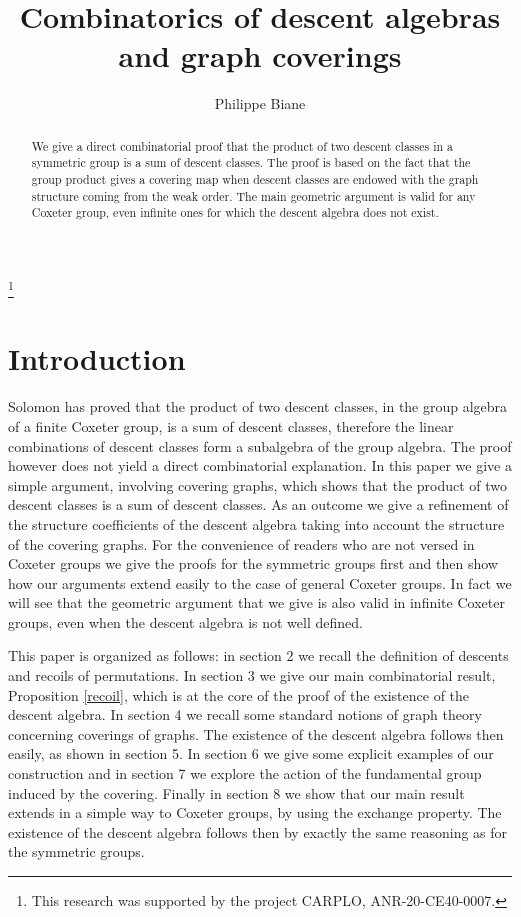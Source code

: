 \documentclass[11pt,a4paper]{amsart}
\theoremstyle{contraction}
\begin{document}
\author{Philippe  Biane}
\thanks{This research was supported by the project CARPLO, ANR-20-CE40-0007.}
\address{Institut Gaspard Monge
UMR CNRS - 8049
Universit\'e Gustave Eiffel
5 boulevard Descartes, 
77454 Champs-Sur-Marne
FRANCE}



\title{Combinatorics of descent algebras and graph coverings}


\begin{abstract}
We give a direct combinatorial proof that the product of two descent classes in a  symmetric  group is a sum of descent classes. The proof is based on the fact that the group product gives a covering map when descent classes are endowed with the graph structure coming from the weak order. The main geometric argument is valid for any Coxeter group, even infinite ones for which the descent algebra does not exist.
\end{abstract}
\maketitle
\section{Introduction}
Solomon \cite{S} has proved that the product of two descent classes, in the group algebra of a finite Coxeter group, is a sum of descent classes, therefore the linear combinations of descent classes form a subalgebra of the group algebra. The proof  however does not yield a direct combinatorial explanation. In this paper we give a simple  argument, involving covering graphs, which shows that the product of two descent classes is a sum of descent classes.  As an outcome we  give  a refinement of the structure coefficients of the descent algebra taking into account the structure of the covering graphs.  For the convenience of readers who are not versed in Coxeter groups we give the proofs for the symmetric groups first and then show how our arguments extend easily to the case of general Coxeter groups. In fact we will see that the geometric argument that we give is also valid  in infinite Coxeter groups, even when the descent algebra is not well defined.

This paper is organized as follows: in section 2 we recall the definition of descents and recoils of permutations.
In section 3 we give our main combinatorial result, Proposition \ref{recoil}, which is at the core of the proof of the existence of the descent algebra. In section 4 we recall some standard notions of graph theory concerning coverings of graphs. The existence of the descent algebra follows then easily, as shown in section 5. In section 6 we give some explicit examples of our construction and in section 7 we explore the action of the fundamental group induced by the covering. 
 Finally in section 8 we show that our main result extends in a simple way to   Coxeter groups, by using the exchange property. The existence of the descent algebra follows then by exactly the same reasoning as for the symmetric groups.  
\end{document}
